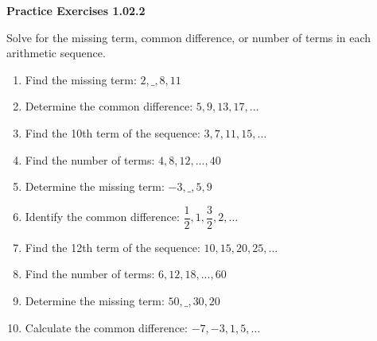 \vspace{0.3ex}
\noindent\textbf{Practice Exercises 1.02.2}

\vspace{0.2ex}

Solve for the missing term, common difference, or number of terms in each arithmetic sequence.
\begin{enumerate}
    \item Find the missing term: $2, \_, 8, 11$
    \item Determine the common difference: $5, 9, 13, 17, \dots$
    \item Find the 10th term of the sequence: $3, 7, 11, 15, \dots$
    \item Find the number of terms: $4, 8, 12, ..., 40$
    \item Determine the missing term: $-3, \_, 5, 9$
    \item Identify the common difference: $\dfrac{1}{2}, 1, \dfrac{3}{2}, 2, \dots$
    \item Find the 12th term of the sequence: $10, 15, 20, 25, \dots$
    \item Find the number of terms: $6, 12, 18, ..., 60$
    \item Determine the missing term: $50, \_, 30, 20$
    \item Calculate the common difference: $-7, -3, 1, 5, \dots$
\end{enumerate}